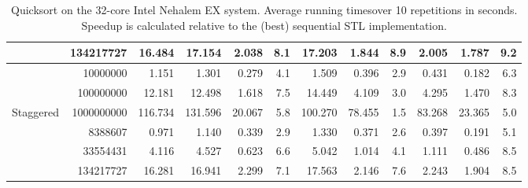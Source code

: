 \documentclass[preprint]{sigplanconf}
\begin{document}
\begin{table*}[t!]
\begin{center}
\begin{tabular}{|lr|rr|rrr|rrr||rr|}
 & 134217727 & 16.484 & 17.154 & 2.038 & 8.1 & 17.203 & 1.844 & 8.9 & 2.005 & 1.787 & 9.2 \\
\hline
 & 10000000 & 1.151 & 1.301 & 0.279 & 4.1 & 1.509 & 0.396 & 2.9 & 0.431 & 0.182 & 6.3 \\
 & 100000000 & 12.181 & 12.498 & 1.618 & 7.5 & 14.449 & 4.109 & 3.0 & 4.295 & 1.470 & 8.3 \\
Staggered & 1000000000 & 116.734 & 131.596 & 20.067 & 5.8 & 100.270 & 78.455 & 1.5 & 83.268 & 23.365 & 5.0 \\
 & 8388607 & 0.971 & 1.140 & 0.339 & 2.9 & 1.330 & 0.371 & 2.6 & 0.397 & 0.191 & 5.1 \\
 & 33554431 & 4.116 & 4.527 & 0.623 & 6.6 & 5.042 & 1.014 & 4.1 & 1.111 & 0.486 & 8.5 \\
 & 134217727 & 16.281 & 16.941 & 2.299 & 7.1 & 17.563 & 2.146 & 7.6 & 2.243 & 1.904 & 8.5 \\
\hline
\end{tabular}
\end{center}
\caption{Quicksort on the 32-core Intel Nehalem EX system. 
Average running timesover 10 repetitions in seconds.
Speedup is calculated relative to the (best) sequential STL implementation.}
\label{tab:sort_meret_avg}
\end{table*}
\end{document}
